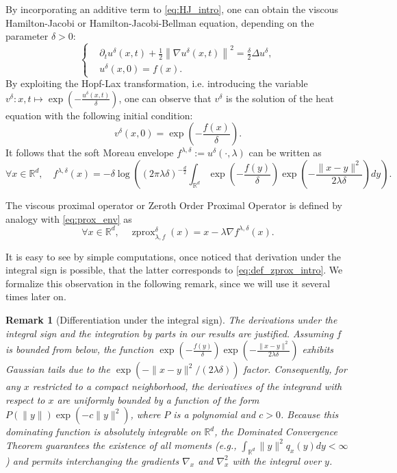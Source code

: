 \documentclass{article}
\newtheorem{remark}{Remark}
\newcommand{\R}{\mathbb{R}}
\newcommand{\zprox}{\ensuremath{\operatorname{zprox}}}
\begin{document}
By incorporating an additive term to \eqref{eq:HJ_intro}, one can obtain the viscous Hamilton-Jacobi or Hamilton-Jacobi-Bellman equation, depending on the parameter \(\delta>0\):
\begin{equation}\label{eq:HJB_intro}\tag{HJB}
    \left\{\begin{aligned}
        &\partial_t u^\delta(x,t) + \frac{1}{2}\left\|\nabla u^\delta(x,t)\right\|^2 = \frac{\delta}{2}\Delta u^\delta,\\
        &u^\delta(x,0)=f(x).
        \end{aligned}\right.
\end{equation}
By exploiting the Hopf-Lax transformation, i.e. introducing the variable \(v^\delta:x,t\mapsto \exp\left(-\frac{u^\delta(x,t)}{\delta}\right)\), one can observe that \(v^\delta\) is the solution of the heat equation with the following initial condition:
\[v^\delta(x,0)=\exp\left(-\frac{f(x)}{\delta}\right).\]
It follows that the soft Moreau envelope \(f^{\lambda,\delta}:=u^\delta(\cdot,\lambda)\) can be written as
\[\forall x\in\R^d,\quad f^{\lambda,\delta}(x)=-\delta\log\left(\left(2\pi \lambda\delta\right)^{-\frac{d}{2}}\int_{\R^d}\exp\left(-\frac{f(y)}{\delta}\right)\exp\left(-\frac{\|x-y\|^2}{2\lambda\delta}\right)dy\right).\]

The viscous proximal operator or Zeroth Order Proximal Operator is defined by analogy with \eqref{eq:prox_env} as
\begin{equation}\label{eq:zprox_softenvelope_app}
    \forall x \in\R^d,\quad \zprox^{\delta}_{\lambda, f}(x)=x-\lambda\nabla f^{\lambda,\delta}(x).
\end{equation}

It is easy to see by simple computations, once noticed that derivation under the integral sign is possible, that the latter corresponds to \eqref{eq:def_zprox_intro}. We formalize this observation in the following remark, since we will use it several times later on.

\begin{remark}[Differentiation under the integral sign]\label{rem:differentiation}
The derivations under the integral sign and the integration by parts in our results are justified. Assuming $f$ is bounded from below, the function $\exp\left(-\frac{f(y)}{\delta}\right)\exp\left(-\frac{\|x-y\|^2}{2\lambda\delta}\right)$ exhibits Gaussian tails due to the $\exp(-\|x-y\|^2/(2\lambda\delta))$ factor. Consequently, for any $x$ restricted to a compact neighborhood, the derivatives of the integrand with respect to $x$ are uniformly bounded by a function of the form $P(\|y\|)\exp(-c\|y\|^2)$, where $P$ is a polynomial and $c>0$. Because this dominating function is absolutely integrable on $\mathbb{R}^d$, the Dominated Convergence Theorem guarantees the existence of all moments (e.g., $\int_{\mathbb{R}^d}\|y\|^2 q_x(y) dy < \infty$) and permits interchanging the gradients $\nabla_x$ and $\nabla_x^2$ with the integral over $y$.
\end{remark}
\end{document}
